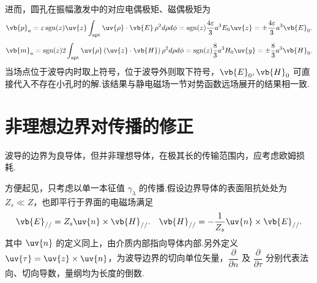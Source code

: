 进而，圆孔在振幅激发中的对应电偶极矩、磁偶极矩为
\begin{align*}
	\vb{p}_a = \varepsilon \,\text{sgn}(z) \uv{z} \int_{\text{apt}} \uv{\rho} \cdot \vb{E} \, \rho^2 d\rho d\phi = \text{sgn}(z) \dfrac{4\varepsilon}{3} a^3 E_0 \uv{z} = \pm \dfrac{4\varepsilon}{3} a^3 \vb{E}_0.
\end{align*}
\begin{align*}
	\vb{m}_a = \text{sgn}(z) 2 \int_{\text{apt}} \uv{\rho} \left( \uv{z} \cdot \vb{H} \right) \rho^2 d\rho d\phi = \text{sgn}(z) \dfrac{8}{3} a^3 H_0 \uv{y} = \pm \dfrac{8}{3} a^3 \vb{H}_0.
\end{align*}
当场点位于波导内时取上符号，位于波导外则取下符号，\(\vb{E}_0, \vb{H}_0\) 可直接代入不存在小孔时的解.该结果与静电磁场一节对势函数远场展开的结果相一致.


\section{非理想边界对传播的修正}

波导的边界为良导体，但并非理想导体，在极其长的传输范围内，应考虑欧姆损耗.

方便起见，只考虑以单一本征值 \(\gamma_{\lambda}\) 的传播.假设边界导体的表面阻抗处处为 \(Z_s \ll Z\)，也即平行于界面的电磁场满足
\begin{align*}
	\vb{E}_{//} = Z_s \uv{n} \times \vb{H}_{//}. \quad \vb{H}_{//} = -\dfrac{1}{Z_s} \uv{n} \times \vb{E}_{//}.
\end{align*}
其中 \(\uv{n}\) 的定义同上，由介质内部指向导体内部.另外定义 \(\uv{\tau} = \uv{z} \times \uv{n}\)，为波导边界的切向单位矢量，\(\dfrac{\partial}{\partial n}\) 及 \(\dfrac{\partial}{\partial{\tau}}\) 分别代表法向、切向导数，量纲均为长度的倒数.


